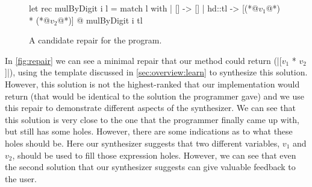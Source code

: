 \begin{figure}[ht]
  \begin{ecode}
  let rec mulByDigit i l =
    match l with
    | []     -> []
    | hd::tl -> [(*@$v_1$@*) * (*@$v_2$@*)] @ mulByDigit i tl
  \end{ecode}
  \caption{A candidate repair for the \mbd program.}
  \label{fig:repair}
  \end{figure}

 In \autoref{fig:repair} we can see a minimal repair that our
method could return (|[$v_1$ * $v_2$]|), using the template discussed in
\autoref{sec:overview:learn} to synthesize this solution. However, this solution
is not the highest-ranked that our implementation would return (that would be
identical to the solution the programmer gave) and we use this repair to
demonstrate different aspects of the synthesizer. We can see that this solution
is very close to the one that the programmer finally came up with, but still has
some holes. However, there are some indications as to what these holes should
be. Here our synthesizer suggests that two different variables, $v_1$ and $v_2$,
should be used to fill those expression holes. However, we can see that even the
second solution that our synthesizer suggests can give valuable feedback to the
user.
